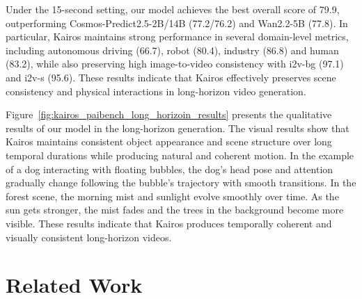 \documentclass{llmxive}
\begin{document}
Under the 15-second setting, our model achieves the best overall score of 79.9, outperforming Cosmos-Predict2.5-2B/14B (77.2/76.2) and Wan2.2-5B (77.8). In particular, Kairos maintains strong performance in several domain-level metrics, including autonomous driving (66.7), robot (80.4), industry (86.8) and human (83.2), while also preserving high image-to-video consistency with i2v-bg (97.1) and i2v-s (95.6). These results indicate that Kairos effectively preserves scene consistency and physical interactions in long-horizon video generation.

Figure~\ref{fig:kairos_paibench_long_horizoin_results} presents the qualitative results of our model in the long-horizon generation. The visual results show that Kairos maintains consistent object appearance and scene structure over long temporal durations while producing natural and coherent motion. In the example of a dog interacting with floating bubbles, the dog’s head pose and attention gradually change following the bubble's trajectory with smooth transitions. In the forest scene, the morning mist and sunlight evolve smoothly over time. As the sun gets stronger, the mist fades and the trees in the background become more visible. These results indicate that Kairos produces temporally coherent and visually consistent long-horizon videos.






\section{Related Work}
\end{document}
